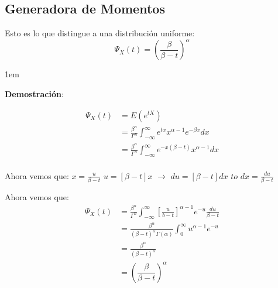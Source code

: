 \documentclass[12pt, fleqn]{report}                             %
\newenvironment{SmallIndentation}[1][0.75em]                    %
        {\begin{adjustwidth}{#1}{}\begin{footnotesize}}             %
        {\end{footnotesize}\end{adjustwidth}}                       %
\theoremstyle{break}                                            %
\newcommand{\Brackets}[1]{\left[ #1 \right]}                    %
\newcommand{\Wrap}[1]{\left( #1 \right)}                        %
\newcommand{\pfrac}[2]{\Wrap{\dfrac{#1}{#2}}}                   %
\begin{document}
            \clearpage
            \subsection{Generadora de Momentos}

                Esto es lo que distingue a una distribución uniforme:
                \begin{equation*}
                    \Psi_X(t) = \pfrac{\beta}{\beta - t}^\alpha
                \end{equation*}

                \begin{SmallIndentation}[1em]
                    \textbf{Demostración}:
                    
                    \begin{align*}
                        \Psi_X(t)
                            &= E(e^{tX})        \\
                            &= \frac{\beta^n}{\Gamma^n} \int_{-\infty}^\infty e^{tx} x^{\alpha-1} e^{-\beta x} dx   \\
                            &= \frac{\beta^n}{\Gamma^n} \int_{-\infty}^\infty e^{-x(\beta - t)} x^{\alpha-1} dx     \\
                    \end{align*}

                    Ahora vemos que:
                    $x = \frac{u}{\beta - t}$ 
                            $u = [\beta - t]x$ $\to$ $du = [\beta - t]dx$ $to$ $dx = \frac{du}{\beta - t}$  

                    Ahora vemos que:
                    \begin{align*}
                        \Psi_X(t)
                            &= \frac{\beta^n}{\Gamma^n} \int_{-\infty}^\infty 
                                \Brackets{\frac{u}{b- t}}^{\alpha - 1} e^{-u} \frac{du}{\beta - t}                  \\
                            &= \frac{\beta^\alpha}{(\beta -t)^\alpha \Gamma(\alpha)} 
                                \int_0^\infty u^{\alpha - 1}e^{-u}                                                  \\
                            &= \frac{\beta^\alpha}{(\beta -t)^\alpha}                                               \\
                            &= \pfrac{\beta}{\beta - t}^\alpha
                    \end{align*}

                \end{SmallIndentation}
\end{document}
